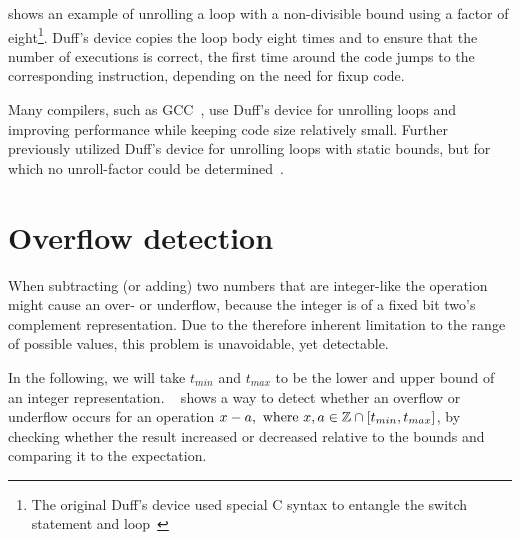  shows an example of unrolling a loop with a non-divisible bound using a factor of eight\footnote{The original Duff's device used special C syntax to entangle the switch statement and loop~\cite{duff_1983}}.
Duff's device copies the loop body eight times and to ensure that the number of executions is correct, the first time around the code jumps to the corresponding instruction, depending on the need for fixup code.

Many compilers, such as GCC~\cite{gcc}, use Duff's device for unrolling loops and improving performance while keeping code size relatively small.
Further \libFIRM{} previously utilized Duff's device for unrolling loops with static bounds, but for which no unroll-factor could be determined~\cite{helmer10studienarbeit}.



\section{Overflow detection}\label{sec:basics:overflow}

When subtracting (or adding) two numbers that are integer-like the operation might cause an over- or underflow, because the integer is of a fixed bit two's complement representation.
Due to the therefore inherent limitation to the range of possible values, this problem is unavoidable, yet detectable.

In the following, we will take $t_{min}$ and $t_{max}$ to be the lower and upper bound of an integer representation.
~\cite{pmg_2009} shows a way to detect whether an overflow or underflow occurs for an operation $x - a, \text{ where } x, a \in \mathbb{Z} \cap {\lbrack t_{min}, t_{max} \rbrack}$, by checking whether the result increased or decreased relative to the bounds and comparing it to the expectation.


